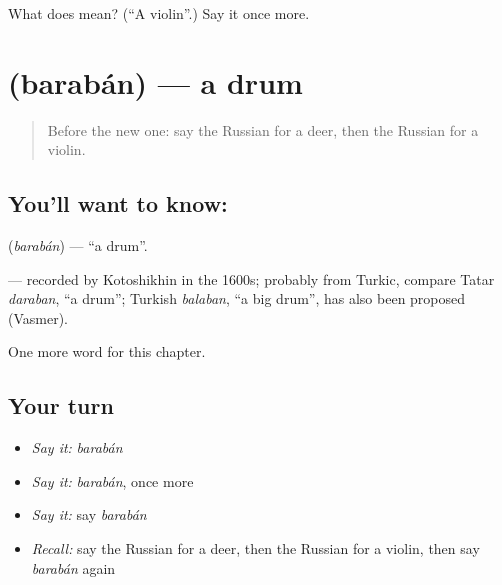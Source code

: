 \begin{tcolorbox}[breakable,colback=teal!4,colframe=teal!35!black,title={Before you move on}]
What does  mean? (\textquotedblleft{}A violin\textquotedblright{}.) Say it once more.
\end{tcolorbox}
\section[\texorpdfstring{\ru{барабан} (barabán)}{барабан (barabán)}]{ (barabán) — a drum}

\label{lesson:RU-C226-baraban}



\begin{quote}
Before the new one: say the Russian for a deer, then the Russian for a violin.
\end{quote}

\subsection*{You'll want to know: }
\textbf{} (\emph{barabán}) — \textquotedblleft{}a drum\textquotedblright{}.

\begin{cousinweb}
\textbf{} — recorded by Kotoshikhin in the 1600s; probably from Turkic, compare Tatar \emph{daraban}, \textquotedblleft{}a drum\textquotedblright{}; Turkish \emph{balaban}, \textquotedblleft{}a big drum\textquotedblright{}, has also been proposed (Vasmer).
\end{cousinweb}

\begin{grammarlens}[title={What you've built}]
One more word for this chapter.
\end{grammarlens}

\subsection*{Your turn}
\begin{itemize}
\raggedright
  \item \emph{Say it:} \emph{barabán}
  \item \emph{Say it:} \emph{barabán}, once more
  \item \emph{Say it:} say \emph{barabán}
  \item \emph{Recall:} say the Russian for a deer, then the Russian for a violin, then say \emph{barabán} again
\end{itemize}

